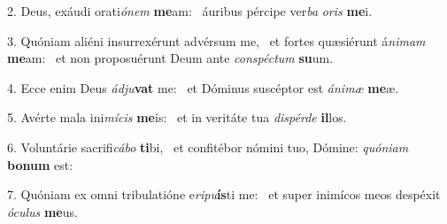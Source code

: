 2. Deus, exáudi orati\textit{ó}\textit{nem} \textbf{me}am: \ast\  áuribus pércipe ver\textit{ba} \textit{o}\textit{ris} \textbf{me}i.\

3. Quóniam aliéni insurrexérunt advérsum me, \dag\  et fortes quæsiérunt á\textit{ni}\textit{mam} \textbf{me}am: \ast\  et non proposuérunt Deum ante \textit{con}\textit{spéc}\textit{tum} \textbf{su}um.\

4. Ecce enim Deus \textit{ád}\textit{ju}\textbf{vat} me: \ast\  et Dóminus suscéptor est \textit{á}\textit{ni}\textit{mæ} \textbf{me}æ.\

5. Avérte mala ini\textit{mí}\textit{cis} \textbf{me}is: \ast\  et in veritáte tua \textit{dis}\textit{pér}\textit{de} \textbf{il}los.\

6. Voluntárie sacrifi\textit{cá}\textit{bo} \textbf{ti}bi, \ast\  et confitébor nómini tuo, Dómine: \textit{quón}\textit{i}\textit{am} \textbf{bo}\textbf{num} est:\

7. Quóniam ex omni tribulatióne e\textit{ri}\textit{pu}\textbf{ís}ti me: \ast\  et super inimícos meos despéxit \textit{ó}\textit{cu}\textit{lus} \textbf{me}us.\

